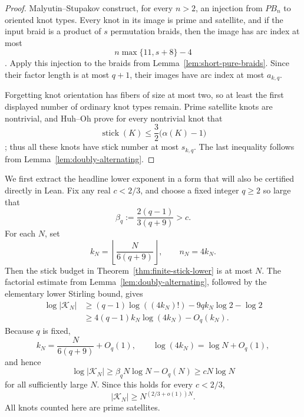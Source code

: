 \documentclass[11pt]{article}
\theoremstyle{remark}
\theoremstyle{plain}
\newcommand{\Kcal}{\mathcal{K}}
\begin{document}
\begin{proof}
Malyutin--Stupakov construct, for every \(n>2\), an injection from \(PB_n\)
to oriented knot types.  Every knot in its image is prime and satellite, and
if the input braid is a product of \(s\) permutation braids, then the image has
arc index at most
\[
    n\max\{11,s+8\}-4
\]
\cite[Proposition 1, pp.~3--4]{MalyutinStupakovArc}.  Apply this injection to
the braids from Lemma~\ref{lem:short-pure-braids}.  Since their factor length
is at most \(q+1\), their images have arc index at most \(a_{k,q}\).

Forgetting knot orientation has fibers of size at most two, so at least the
first displayed number of ordinary knot types remain.  Prime satellite knots
are nontrivial, and Huh--Oh prove for every nontrivial knot that
\[
    \operatorname{stick}(K)
       \le\frac32\bigl(\alpha(K)-1\bigr)
\]
\cite[Theorem 3]{HuhOh}; thus all these knots have stick number at most
\(s_{k,q}\).  The last inequality follows from
Lemma~\ref{lem:doubly-alternating}.
\end{proof}

We first extract the headline lower exponent in a form that will also be
certified directly in Lean.  Fix any real \(c<2/3\), and choose a fixed integer
\(q\ge2\) so large that
\[
    \beta_q:=\frac{2(q-1)}{3(q+9)}>c.
\]
For each \(N\), set
\[
    k_N=\left\lfloor\frac{N}{6(q+9)}\right\rfloor,
    \qquad n_N=4k_N.
\]
Then the stick budget in Theorem~\ref{thm:finite-stick-lower} is at most
\(N\).  The factorial estimate from
Lemma~\ref{lem:doubly-alternating}, followed by the elementary lower Stirling
bound, gives
\[
 \begin{aligned}
 \log|\Kcal_N|
 &\ge (q-1)\log((4k_N)!)-9qk_N\log2-\log2\\
 &\ge 4(q-1)k_N\log(4k_N)-O_q(k_N).
 \end{aligned}
\]
Because \(q\) is fixed,
\[
    k_N=\frac{N}{6(q+9)}+O_q(1),
    \qquad \log(4k_N)=\log N+O_q(1),
\]
and hence
\[
    \log|\Kcal_N|\ge \beta_qN\log N-O_q(N)
       \ge cN\log N
\]
for all sufficiently large \(N\).  Since this holds for every \(c<2/3\),
\[
    |\Kcal_N|\ge N^{(2/3+o(1))N}.
\]
All knots counted here are prime satellites.
\end{document}
